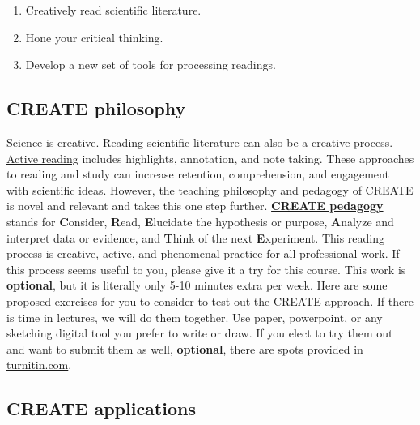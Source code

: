 \documentclass[
]{book}
\providecommand{\tightlist}{%
  \setlength{\itemsep}{0pt}\setlength{\parskip}{0pt}}
\begin{document}
\begin{enumerate}
\def\labelenumi{\arabic{enumi}.}
\tightlist
\item
  Creatively read scientific literature.\\
\item
  Hone your critical thinking.\\
\item
  Develop a new set of tools for processing readings.
\end{enumerate}

\hypertarget{create-philosophy}{%
\subsection*{CREATE philosophy}\label{create-philosophy}}

Science is creative. Reading scientific literature can also be a creative process. \href{https://help.open.ac.uk/active-reading}{Active reading} includes highlights, annotation, and note taking. These approaches to reading and study can increase retention, comprehension, and engagement with scientific ideas. However, the teaching philosophy and pedagogy of CREATE is novel and relevant and takes this one step further. \href{https://academic.oup.com/genetics/article/176/3/1381/6062159}{\textbf{CREATE pedagogy}} stands for \textbf{C}onsider, \textbf{R}ead, \textbf{E}lucidate the hypothesis or purpose, \textbf{A}nalyze and interpret data or evidence, and \textbf{T}hink of the next \textbf{E}xperiment. This reading process is creative, active, and phenomenal practice for all professional work. If this process seems useful to you, please give it a try for this course. This work is \textbf{optional}, but it is literally only 5-10 minutes extra per week. Here are some proposed exercises for you to consider to test out the CREATE approach. If there is time in lectures, we will do them together. Use paper, powerpoint, or any sketching digital tool you prefer to write or draw. If you elect to try them out and want to submit them as well, \textbf{optional}, there are spots provided in \href{https://turnitin.com}{turnitin.com}.

\hypertarget{create-applications}{%
\subsection*{CREATE applications}\label{create-applications}}
\end{document}
